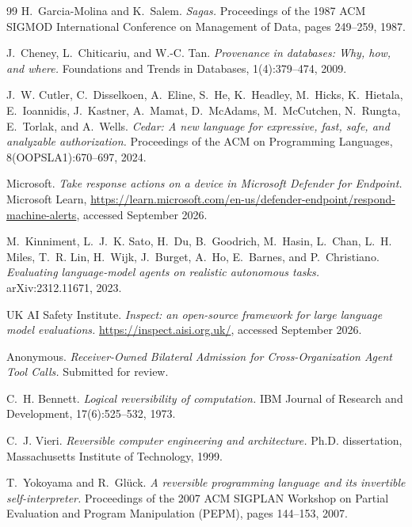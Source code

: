 \documentclass[11pt,letterpaper]{article}
\begin{document}

\begin{thebibliography}{99}
H.~Garcia-Molina and K.~Salem.
\emph{Sagas.}
Proceedings of the 1987 ACM SIGMOD International Conference on Management
of Data, pages 249--259, 1987.

J.~Cheney, L.~Chiticariu, and W.-C. Tan.
\emph{Provenance in databases: Why, how, and where.}
Foundations and Trends in Databases, 1(4):379--474, 2009.

J.~W. Cutler, C.~Disselkoen, A.~Eline, S.~He, K.~Headley, M.~Hicks,
K.~Hietala, E.~Ioannidis, J.~Kastner, A.~Mamat, D.~McAdams,
M.~McCutchen, N.~Rungta, E.~Torlak, and A.~Wells.
\emph{Cedar: A new language for expressive, fast, safe, and analyzable
authorization.}
Proceedings of the ACM on Programming Languages, 8(OOPSLA1):670--697,
2024.

Microsoft.
\emph{Take response actions on a device in Microsoft Defender for
Endpoint.}
Microsoft Learn, \url{https://learn.microsoft.com/en-us/defender-endpoint/respond-machine-alerts},
accessed September 2026.

M.~Kinniment, L.~J.~K. Sato, H.~Du, B.~Goodrich, M.~Hasin, L.~Chan,
L.~H. Miles, T.~R. Lin, H.~Wijk, J.~Burget, A.~Ho, E.~Barnes, and
P.~Christiano.
\emph{Evaluating language-model agents on realistic autonomous tasks.}
arXiv:2312.11671, 2023.

UK AI Safety Institute.
\emph{Inspect: an open-source framework for large language model
evaluations.}
\url{https://inspect.aisi.org.uk/}, accessed September 2026.

Anonymous.
\emph{Receiver-Owned Bilateral Admission for Cross-Organization Agent
Tool Calls.}
Submitted for review.

C.~H. Bennett.
\emph{Logical reversibility of computation.}
IBM Journal of Research and Development, 17(6):525--532, 1973.

C.~J. Vieri.
\emph{Reversible computer engineering and architecture.}
Ph.D. dissertation, Massachusetts Institute of Technology, 1999.

T.~Yokoyama and R.~Gl\"uck.
\emph{A reversible programming language and its invertible
self-interpreter.}
Proceedings of the 2007 ACM SIGPLAN Workshop on Partial Evaluation and
Program Manipulation (PEPM), pages 144--153, 2007.


\end{thebibliography}
\end{document}
